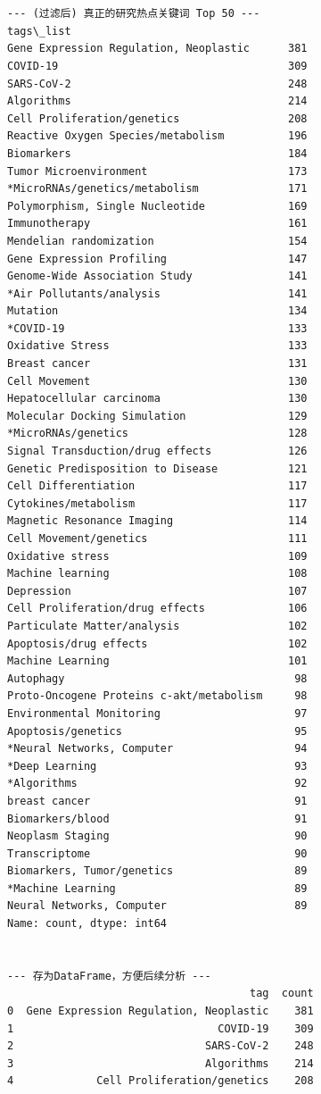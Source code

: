 \documentclass[11pt]{article}
\begin{document}
    \begin{Verbatim}[commandchars=\\\{\}]


--- (过滤后) 真正的研究热点关键词 Top 50 ---
tags\_list
Gene Expression Regulation, Neoplastic      381
COVID-19                                    309
SARS-CoV-2                                  248
Algorithms                                  214
Cell Proliferation/genetics                 208
Reactive Oxygen Species/metabolism          196
Biomarkers                                  184
Tumor Microenvironment                      173
*MicroRNAs/genetics/metabolism              171
Polymorphism, Single Nucleotide             169
Immunotherapy                               161
Mendelian randomization                     154
Gene Expression Profiling                   147
Genome-Wide Association Study               141
*Air Pollutants/analysis                    141
Mutation                                    134
*COVID-19                                   133
Oxidative Stress                            133
Breast cancer                               131
Cell Movement                               130
Hepatocellular carcinoma                    130
Molecular Docking Simulation                129
*MicroRNAs/genetics                         128
Signal Transduction/drug effects            126
Genetic Predisposition to Disease           121
Cell Differentiation                        117
Cytokines/metabolism                        117
Magnetic Resonance Imaging                  114
Cell Movement/genetics                      111
Oxidative stress                            109
Machine learning                            108
Depression                                  107
Cell Proliferation/drug effects             106
Particulate Matter/analysis                 102
Apoptosis/drug effects                      102
Machine Learning                            101
Autophagy                                    98
Proto-Oncogene Proteins c-akt/metabolism     98
Environmental Monitoring                     97
Apoptosis/genetics                           95
*Neural Networks, Computer                   94
*Deep Learning                               93
*Algorithms                                  92
breast cancer                                91
Biomarkers/blood                             91
Neoplasm Staging                             90
Transcriptome                                90
Biomarkers, Tumor/genetics                   89
*Machine Learning                            89
Neural Networks, Computer                    89
Name: count, dtype: int64


--- 存为DataFrame，方便后续分析 ---
                                      tag  count
0  Gene Expression Regulation, Neoplastic    381
1                                COVID-19    309
2                              SARS-CoV-2    248
3                              Algorithms    214
4             Cell Proliferation/genetics    208
    \end{Verbatim}
\end{document}
